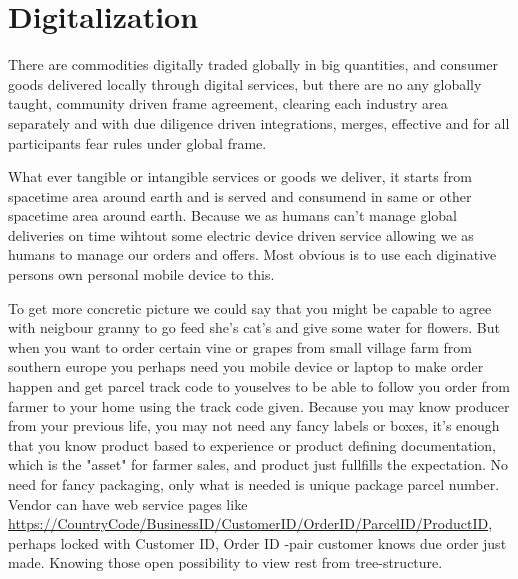 \section{Digitalization}
\label{digitalization}
There are commodities digitally traded globally in big quantities, and consumer
goods delivered locally through digital services, but there are no any globally
taught, community driven frame agreement, clearing each industry area separately
and with due diligence driven integrations, merges, effective and for all
participants fear rules under global frame.

What ever tangible or intangible services or goods we deliver, it starts from
spacetime area around earth and is served and consumend in same or other
spacetime area around earth. Because we as humans can't manage global deliveries
on time wihtout some electric device driven service allowing we as humans to
manage our orders and offers. Most obvious is to use each diginative persons
own personal mobile device to this.

To get more concretic picture we could say that you might be capable to agree
with neigbour granny to go feed she's cat's and give some water for flowers.
But when you want to order certain vine or grapes from small village farm from
southern europe you perhaps need you mobile device or laptop to make order
happen and get parcel track code to youselves to be able to follow you order
from farmer to your home using the track code given. Because you may know
producer from your previous life, you may not need any fancy labels or boxes,
it's enough that you know product based to experience or product defining
documentation, which is the "asset" for farmer sales, and product just
fullfills the expectation. No need for fancy packaging, only what is needed is
unique package parcel number. Vendor can have web service pages like
\url{https://CountryCode/BusinessID/CustomerID/OrderID/ParcelID/ProductID},
perhaps locked with Customer ID, Order ID -pair customer knows due order
just made. Knowing those open possibility to view rest from tree-structure.

